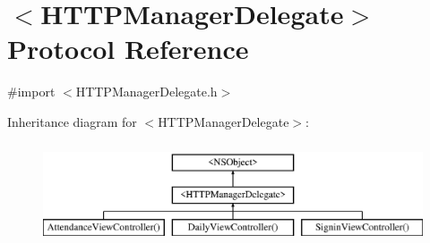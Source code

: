 \hypertarget{protocol_h_t_t_p_manager_delegate-p}{\section{$<$H\+T\+T\+P\+Manager\+Delegate$>$ Protocol Reference}
\label{protocol_h_t_t_p_manager_delegate-p}
}


{\ttfamily \#import $<$H\+T\+T\+P\+Manager\+Delegate.\+h$>$}

Inheritance diagram for $<$H\+T\+T\+P\+Manager\+Delegate$>$\+:\begin{figure}[H]
\begin{center}
\leavevmode
\includegraphics[height=3.000000cm]{protocol_h_t_t_p_manager_delegate-p}
\end{center}
\end{figure}
